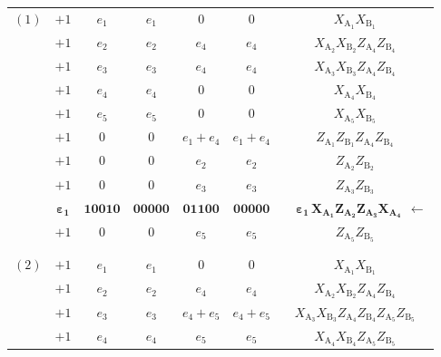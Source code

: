 \documentclass[journal,onecolumn]{IEEEtran}
\begin{document}
\begin{table}
\begin{tabularx}{.8\linewidth}{c c || *{2}{C} | *{2}{C} || c}
%
$(1)$ & $+1$ &    $e_1$ & $e_1$   &   $0$ & $0$    & $X_{\text{A}_1} X_{\text{B}_1}$ \\
     & $+1$ &    $e_2$ & $e_2$   &   $e_4$ & $e_4$    & $X_{\text{A}_2} X_{\text{B}_2} Z_{\text{A}_4} Z_{\text{B}_4}$ \\
     & $+1$ &    $e_3$ & $e_3$   &   $e_4$ & $e_4$    & $X_{\text{A}_3} X_{\text{B}_3} Z_{\text{A}_4} Z_{\text{B}_4}$ \\
     & $+1$ &    $e_4$ & $e_4$   &   $0$ & $0$    & $X_{\text{A}_4} X_{\text{B}_4}$ \\
     & $+1$ &    $e_5$ & $e_5$   &   $0$ & $0$    & $X_{\text{A}_5} X_{\text{B}_5}$ \\
\cmidrule(lr){2-7}
     & $+1$ &    $0$ & $0$   &   $e_1+e_4$ & $e_1+e_4$    & $Z_{\text{A}_1} Z_{\text{B}_1} Z_{\text{A}_4} Z_{\text{B}_4}$ \\
     & $+1$ &    $0$ & $0$   &   $e_2$ & $e_2$    & $Z_{\text{A}_2} Z_{\text{B}_2}$ \\
     & $+1$ &    $0$ & $0$   &   $e_3$ & $e_3$    & $Z_{\text{A}_3} Z_{\text{B}_3}$ \\
     & $\boldsymbol{ \varepsilon_1 }$ &    $\boldsymbol{ 10010 }$ & $\boldsymbol{ 00000 }$   &   $\boldsymbol{ 01100 }$ & $\boldsymbol{ 00000 }$    & \qquad \ \  $\boldsymbol{ \varepsilon_1 \, X_{\text{A}_1} Z_{\text{A}_2} Z_{\text{A}_3} X_{\text{A}_4} } \ \ \boldsymbol{\longleftarrow} $ \\
     & $+1$ &    $0$ & $0$   &   $e_5$ & $e_5$    & $Z_{\text{A}_5} Z_{\text{B}_5}$ \\
%
     &     &        &       &         &          &                   \\
%
\midrule
%
     &     &        &       &         &          &                   \\
%
$(2)$ & $+1$ &    $e_1$ & $e_1$   &   $0$ & $0$    & $X_{\text{A}_1} X_{\text{B}_1}$ \\
     & $+1$ &    $e_2$ & $e_2$   &   $e_4$ & $e_4$    & $X_{\text{A}_2} X_{\text{B}_2} Z_{\text{A}_4} Z_{\text{B}_4}$ \\
     & $+1$ &    $e_3$ & $e_3$   &   $e_4+e_5$ & $e_4+e_5$    & $X_{\text{A}_3} X_{\text{B}_3} Z_{\text{A}_4} Z_{\text{B}_4} Z_{\text{A}_5} Z_{\text{B}_5}$ \\
     & $+1$ &    $e_4$ & $e_4$   &   $e_5$ & $e_5$    & $X_{\text{A}_4} X_{\text{B}_4} Z_{\text{A}_5} Z_{\text{B}_5}$ \\

\end{tabularx}
\end{table}
\end{document}
